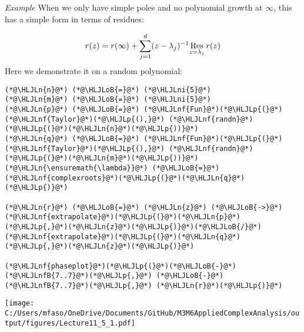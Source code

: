 \documentclass[12pt,landscape]{article}
\newcommand{\HLJLn}[1]{#1}
\newcommand{\HLJLnf}[1]{\textcolor[RGB]{66,102,213}{#1}}
\newcommand{\HLJLnfB}[1]{\textcolor[RGB]{59,151,46}{#1}}
\newcommand{\HLJLni}[1]{\textcolor[RGB]{59,151,46}{#1}}
\newcommand{\HLJLoB}[1]{\textcolor[RGB]{102,102,102}{\textbf{#1}}}
\newcommand{\HLJLp}[1]{#1}
\def\cent#1{\begin{center}#1\end{center} }
\begin{document}
{\newpage
\emph{Example} When we only have simple poles and no polynomial growth at $\infty$, this has a simple form in terms of residues:

\[
r(z) = r(\infty)  +  \sum_{j=1}^d    (z - \lambda_j)^{-1} \underset{z = \lambda_j}{\rm Res}\, r(z)
\]
Here we demonstrate it on a random polynomial:


\begin{lstlisting}
(*@\HLJLn{n}@*) (*@\HLJLoB{=}@*) (*@\HLJLni{5}@*)
(*@\HLJLn{m}@*) (*@\HLJLoB{=}@*) (*@\HLJLni{5}@*)
(*@\HLJLn{p}@*) (*@\HLJLoB{=}@*) (*@\HLJLnf{Fun}@*)(*@\HLJLp{(}@*)(*@\HLJLnf{Taylor}@*)(*@\HLJLp{(),}@*) (*@\HLJLnf{randn}@*)(*@\HLJLp{(}@*)(*@\HLJLn{n}@*)(*@\HLJLp{))}@*)
(*@\HLJLn{q}@*) (*@\HLJLoB{=}@*) (*@\HLJLnf{Fun}@*)(*@\HLJLp{(}@*)(*@\HLJLnf{Taylor}@*)(*@\HLJLp{(),}@*) (*@\HLJLnf{randn}@*)(*@\HLJLp{(}@*)(*@\HLJLn{m}@*)(*@\HLJLp{))}@*)
(*@\HLJLn{\ensuremath{\lambda}}@*) (*@\HLJLoB{=}@*) (*@\HLJLnf{complexroots}@*)(*@\HLJLp{(}@*)(*@\HLJLn{q}@*)(*@\HLJLp{)}@*)

(*@\HLJLn{r}@*) (*@\HLJLoB{=}@*) (*@\HLJLn{z}@*) (*@\HLJLoB{->}@*) (*@\HLJLnf{extrapolate}@*)(*@\HLJLp{(}@*)(*@\HLJLn{p}@*)(*@\HLJLp{,}@*)(*@\HLJLn{z}@*)(*@\HLJLp{)}@*)(*@\HLJLoB{/}@*)(*@\HLJLnf{extrapolate}@*)(*@\HLJLp{(}@*)(*@\HLJLn{q}@*)(*@\HLJLp{,}@*)(*@\HLJLn{z}@*)(*@\HLJLp{)}@*)

(*@\HLJLnf{phaseplot}@*)(*@\HLJLp{(}@*)(*@\HLJLoB{-}@*)(*@\HLJLnfB{7..7}@*)(*@\HLJLp{,}@*) (*@\HLJLoB{-}@*)(*@\HLJLnfB{7..7}@*)(*@\HLJLp{,}@*) (*@\HLJLn{r}@*)(*@\HLJLp{)}@*)
\end{lstlisting}

\cent{\texttt{[image: C:/Users/mfaso/OneDrive/Documents/GitHub/M3M6AppliedComplexAnalysis/output/figures/Lecture11\_5\_1.pdf]}}

}
\end{document}
